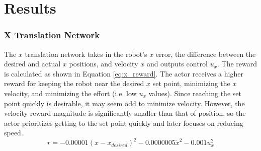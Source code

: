 \section{Results}
\subsubsection{X Translation Network} \label{sec:xtrans_results}
The $x$ translation network takes in the robot's $x$ error, the difference between the desired and actual $x$ positions, and velocity $\dot{x}$ and outputs control $u_x$. The reward is calculated as shown in Equation \ref{eq:x_reward}. The actor receives a higher reward for keeping the robot near the desired $x$ set point, minimizing the $x$ velocity, and minimizing the effort (i.e. low $u_x$ values). Since reaching the set point quickly is desirable, it may seem odd to minimize velocity. However, the velocity reward magnitude is significantly smaller than that of position, so the actor prioritizes getting to the set point quickly and later focuses on reducing speed.
\begin{equation}
r = -0.00001(x-x_{desired})^2-0.0000005\dot{x}^2-0.001u_x^2
\label{eq:x_reward}
\end{equation}

